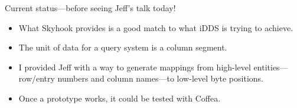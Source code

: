 \documentclass[aspectratio=169]{beamer}
\begin{document}
\begin{frame}{Current status---before seeing Jeff's talk today!}
\Large
\vspace{0.5 cm}
\begin{itemize}\setlength{\itemsep}{0.5 cm}
\item What Skyhook provides is a good match to what iDDS is trying to achieve.
\item The unit of data for a query system is a column segment.
\item I provided Jeff with a way to generate mappings from high-level entities---row/entry numbers and column names---to low-level byte positions.
\item Once a prototype works, it could be tested with Coffea.
\end{itemize}
\end{frame}






\end{document}
